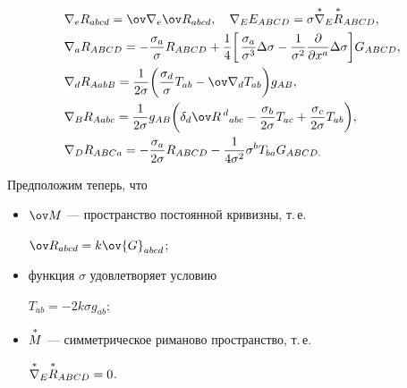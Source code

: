 \begin{align*}


& \nabla_e R_{abcd}=\ov\nabla_e\ov R_{abcd},\quad


\nabla_E E_{ABCD}=\sigma\up{*}{\nabla}_E\up{*}{R}_{ABCD}, \\


& \nabla_a R_{ABCD}=-\frac{\sigma_a}{\sigma}R_{ABCD}+


\frac{1}{4}\biggl[\,\frac{\sigma_a}{\sigma^3}\Delta\sigma-


\frac{1}{\sigma^2}\frac{\partial}{\partial x^a}\Delta\sigma


\biggr]G_{ABCD}, \\


&\nabla_d R_{AabB}=\frac{1}{2\sigma}\biggl(


\frac{\sigma_d}{\sigma}T_{ab}-\ov\nabla_d T_{ab}


\biggr)g_{AB}, \\


& \nabla_B R_{Aabc}=\frac{1}{2\sigma}g_{AB}


\biggl(\delta_d\ov R\,{}^d{}_{abc}-\frac{\sigma_b}{2\sigma}


T_{ac}+\frac{\sigma_c}{2\sigma}T_{ab}\biggr), \\


& \nabla_D R_{ABCa}=-\frac{\sigma_a}{2\sigma}R_{ABCD}-


\frac{1}{4\sigma^2}\sigma^b T_{ba}G_{ABCD.}


\end{align*}





Предположим теперь, что


\begin{itemize}


\item[(a)] $\ov M$ --- пространство постоянной кривизны, т.\,е.


$\ov R_{abcd}=k\ov{G}_{abcd}$;


\item[(б)] функция $\sigma$ удовлетворяет условию


$T_{ab}=-2k\sigma g_{ab}$;


\item[(в)] $\overset{*}{M}{}$ --- симметрическое риманово пространство, т.\,е.


$\overset{*}{\nabla}{}_E\overset{*}{R}{}_{ABCD}=0$.


\end{itemize}


